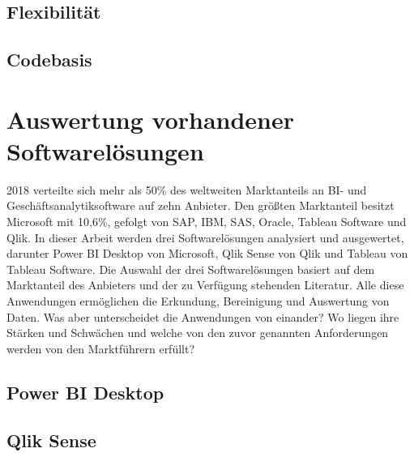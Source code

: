 \subsection{Flexibilität}



\subsection{Codebasis}

\section{Auswertung vorhandener Softwarelösungen}
2018 verteilte sich mehr als 50\% des weltweiten Marktanteils an BI- und Geschäftsanalytiksoftware auf
zehn Anbieter. Den größten Marktanteil besitzt Microsoft mit 10,6\%, gefolgt von SAP, IBM, SAS, Oracle,
Tableau Software und Qlik.\cite{StatistaMarketshareBI}
In dieser Arbeit werden drei Softwarelösungen analysiert und ausgewertet, darunter Power BI Desktop von
Microsoft, Qlik Sense von Qlik und Tableau von Tableau Software. Die Auswahl der drei Softwarelösungen
basiert auf dem Marktanteil des Anbieters und der zu Verfügung stehenden Literatur. Alle diese 
Anwendungen ermöglichen die Erkundung, Bereinigung und Auswertung von Daten. Was aber unterscheidet
die Anwendungen von einander? Wo liegen ihre Stärken und Schwächen und welche von den zuvor genannten
Anforderungen werden von den Marktführern erfüllt?

\subsection{Power BI Desktop}


\subsection{Qlik Sense}

